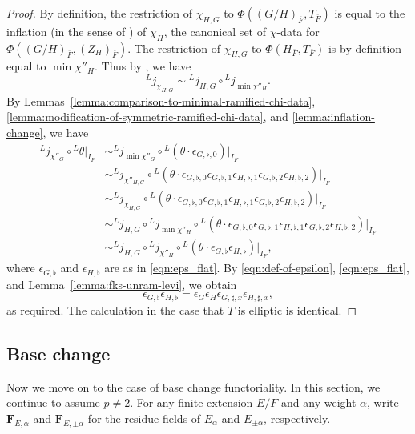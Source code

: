 \documentclass[reqno]{amsart}
\numberwithin{equation}{subsection}
\newcommand{\F}{\mathbf{F}}
\newcommand{\ol}[1]{\overline{#1}}
\newcommand{\ld}{{}^L}
\theoremstyle{remark}
\numberwithin{equation}{subsection}
\numberwithin{figure}{subsection}
\begin{document}
\begin{proof}
By definition, the restriction of $\chi_{H,G}$ to $\Phi((G/H)_{\ol F}, T_{\ol F})$ is equal to the inflation (in the sense of \cite[Definition 5.16]{Kal21a}) of $\chi_H$, the canonical set of $\chi$-data for $\Phi((G/H)_{\ol F}, (Z_H)_{\ol F})$. The restriction of $\chi_{H,G}$ to $\Phi(H_{\ol F}, T_{\ol F})$ is by definition equal to $\min \chi''_H$. Thus by \cite[Proposition 6.9]{Kal21a}, we have
\[
\ld j_{\chi_{H,G}} \sim \ld j_{H,G} \circ \ld j_{\min \chi''_H}.
\]
By Lemmas~\ref{lemma:comparison-to-minimal-ramified-chi-data}, \ref{lemma:modification-of-symmetric-ramified-chi-data}, and \ref{lemma:inflation-change}, we have
\begin{align*}
\ld j_{\chi''_G} \circ \ld\theta|_{I_F} &\sim \ld j_{\min \chi''_G} \circ \ld(\theta \cdot \epsilon_{G,\flat,0})|_{I_F} \\
    &\sim \ld j_{\chi''_{H,G}} \circ \ld(\theta \cdot \epsilon_{G,\flat,0}\epsilon_{G,\flat,1}\epsilon_{H,\flat,1}\epsilon_{G,\flat,2}\epsilon_{H,\flat,2})|_{I_F} \\
    &\sim \ld j_{\chi_{H,G}} \circ \ld(\theta \cdot \epsilon_{G,\flat,0}\epsilon_{G,\flat,1}\epsilon_{H,\flat,1}\epsilon_{G,\flat,2}\epsilon_{H,\flat,2})|_{I_F} \\
    &\sim \ld j_{H,G} \circ \ld j_{\min \chi''_H} \circ \ld(\theta \cdot \epsilon_{G,\flat,0}\epsilon_{G,\flat,1}\epsilon_{H,\flat,1}\epsilon_{G,\flat,2}\epsilon_{H,\flat,2})|_{I_F} \\
    &\sim \ld j_{H, G} \circ \ld j_{\chi''_H} \circ \ld(\theta \cdot \epsilon_{G,\flat}\epsilon_{H,\flat})|_{I_F},
\end{align*}
where $\epsilon_{G,\flat}$ and $\epsilon_{H,\flat}$ are as in \eqref{eqn:eps_flat}. By \eqref{eqn:def-of-epsilon}, \eqref{eqn:eps_flat}, and Lemma~\ref{lemma:fks-unram-levi}, we obtain
\[
\epsilon_{G,\flat}\epsilon_{H,\flat}
=\epsilon_G\epsilon_H\epsilon_{G,\sharp,x}\epsilon_{H,\sharp,x},
\]
as required. The calculation in the case that $T$ is elliptic is identical.
\end{proof}






\subsection{Base change}

Now we move on to the case of base change functoriality. In this section, we continue to assume $p \neq 2$. For any finite extension $E/F$ and any weight $\alpha$, write $\F_{E,\alpha}$ and $\F_{E,\pm\alpha}$ for the residue fields of $E_\alpha$ and $E_{\pm\alpha}$, respectively.
\end{document}
